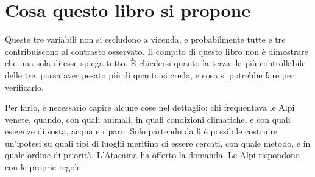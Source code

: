 \section{Cosa questo libro si propone}

Queste tre variabili non si escludono a vicenda, e probabilmente tutte e tre contribuiscono al contrasto osservato. Il compito di questo libro non è dimostrare che una sola di esse spiega tutto. È chiedersi quanto la terza, la più controllabile delle tre, possa aver pesato più di quanto si creda, e cosa si potrebbe fare per verificarlo.

Per farlo, è necessario capire alcune cose nel dettaglio: chi frequentava le Alpi venete, quando, con quali animali, in quali condizioni climatiche, e con quali esigenze di sosta, acqua e riparo. Solo partendo da lì è possibile costruire un'ipotesi su quali tipi di luoghi meritino di essere cercati, con quale metodo, e in quale ordine di priorità. L'Atacama ha offerto la domanda. Le Alpi rispondono con le proprie regole.
